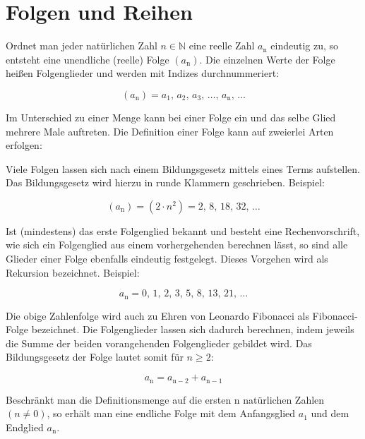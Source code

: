 \newpage
\section{Folgen und Reihen}

Ordnet man jeder natürlichen Zahl $n \in \mathbb{N}$ eine reelle Zahl $a_{\mathrm{n}}$ eindeutig zu, so entsteht eine unendliche (reelle) Folge $(a_{\mathrm{n}})$.
Die einzelnen Werte der Folge heißen Folgenglieder und werden mit Indizes durchnummeriert:

$$( a_{\mathrm{n}} ) = a_1 ,\,  a_2 ,\, a_3 ,\, \ldots,\, a_{\mathrm{n}} ,\, \ldots$$

Im Unterschied zu einer Menge kann bei einer Folge ein und das selbe Glied mehrere Male auftreten.
Die Definition einer Folge kann auf zweierlei Arten erfolgen:

Viele Folgen lassen sich nach einem Bildungsgesetz mittels eines Terms aufstellen. Das Bildungsgesetz wird hierzu in runde Klammern geschrieben.
Beispiel:

$$(a_{\mathrm{n}}) = (2 \cdot n^2) = 2 ,\,  8 ,\,  18 ,\, 32 ,\, \ldots$$

Ist (mindestens) das erste Folgenglied bekannt und besteht eine Rechenvorschrift, wie sich ein Folgenglied aus einem vorhergehenden berechnen lässt, so sind alle Glieder einer Folge ebenfalls eindeutig festgelegt.
Dieses Vorgehen wird als Rekursion bezeichnet. Beispiel:

$$a_{\mathrm{n}} = 0 ,\, 1 ,\, 2 ,\, 3 ,\, 5 ,\, 8 ,\, 13 ,\, 21 ,\, \ldots$$

Die obige Zahlenfolge wird auch zu Ehren von Leonardo Fibonacci als Fibonacci-Folge bezeichnet.
Die Folgenglieder lassen sich dadurch berechnen, indem jeweils die Summe der beiden vorangehenden Folgenglieder gebildet wird.
Das Bildungsgesetz der Folge lautet somit für $n \ge 2$:

$$a_{\mathrm{n}} = a_{\mathrm{n-2}} + a_{\mathrm{n-1}}$$

Beschränkt man die Definitionsmenge auf die ersten n natürlichen Zahlen $(n \ne 0)$, so erhält man eine endliche Folge mit dem Anfangsglied $a_1$ und dem Endglied $a_{\mathrm{n}}$.


\hfill \break

\hfill \break


